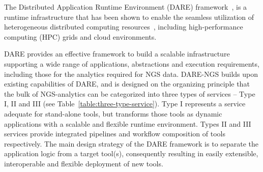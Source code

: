 \documentclass{cpeauth}
\begin{document}
The Distributed Application Runtime Environment (DARE)
framework~\cite{dare-tg11}, is a runtime infrastructure that has been
shown to enable the seamless utilization of heterogeneous distributed
computing
resources~\cite{jha2009developing,saga-royalsoc,saga-ccgrid10},
including high-performance computing (HPC) grids and cloud
environments.

DARE provides an effective framework to build a scalable
infrastructure supporting a wide range of applications, abstractions
and execution requirements, including those for the analytics required
for NGS data.  DARE-NGS builds upon existing capabilities of DARE, and
is designed on the organizing principle that the bulk of NGS-analytics
can be categorized into three types of services -- Type I, II and III
(see Table~\ref{table:three-type-service}). Type I represents a
service adequate for stand-alone tools, but transforms those tools as
dynamic applications with a scalable and flexible runtime
environment. Types II and III services provide integrated pipelines
and workflow composition of tools respectively.  The main design
strategy of the DARE framework is to separate the application logic
from a target tool(s), consequently resulting in %
easily extensible, interoperable and flexible deployment of new tools.



\end{document}

